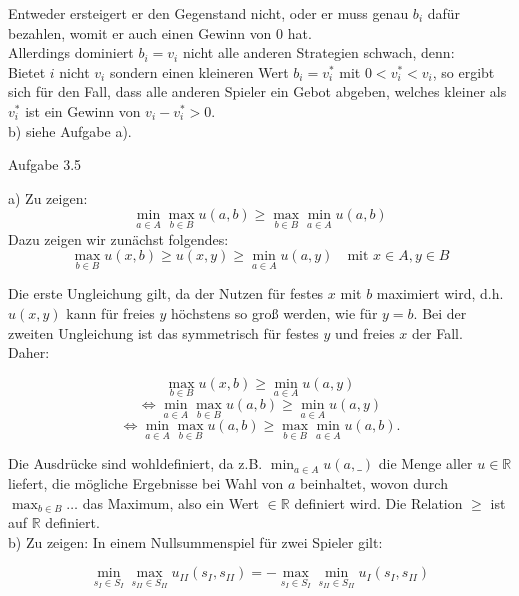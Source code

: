 \documentclass{scrartcl}
\begin{document}
Entweder ersteigert er den Gegenstand nicht, oder er muss genau $b_i$ dafür bezahlen, womit er auch
einen Gewinn von 0 hat. \\

Allerdings dominiert $b_i = v_i$ nicht alle anderen Strategien schwach, denn: \\

Bietet $i$ nicht $v_i$ sondern einen kleineren Wert $b_i = v_i^*$ mit $0 < v_i^* < v_i$, so ergibt
sich für den Fall, dass alle anderen Spieler ein Gebot abgeben, welches kleiner als $v_i^*$ ist ein
Gewinn von $v_i - v_i^* > 0$. \\

b) siehe Aufgabe a). \\

\begin{Large}
Aufgabe 3.5\\[0.0cm]
\end{Large}

a) Zu zeigen: \\
\[
\min_{a \in A} \max_{b \in B} u(a,b) \geq \max_{b \in B} \min_{a \in A} u(a,b)
\]
Dazu zeigen wir zunächst folgendes:
\[
\max_{b \in B} u(x,b) \geq u(x,y) \geq \min_{a \in A} u(a,y) \quad \text{mit }  x \in A, y \in B
\]

Die erste Ungleichung gilt, da der Nutzen für festes $x$ mit $b$ maximiert wird, d.h. $u(x,y)$ kann
für freies $y$ höchstens so groß werden, wie für $y = b$. Bei der zweiten Ungleichung ist das
symmetrisch für festes $y$ und freies $x$ der Fall. \\

Daher:

\[
\max_{b \in B} u(x,b) \geq \min_{a \in A} u(a,y)
\]
\[
\Leftrightarrow \min_{a \in A} \max_{b \in B} u(a,b) \geq \min_{a \in A} u(a,y)
\]
\[
\Leftrightarrow \min_{a \in A} \max_{b \in B} u(a,b) \geq \max_{b \in B} \min_{a \in A} u(a,b).
\]

Die Ausdrücke sind wohldefiniert, da z.B. $\min_{a \in A} u(a,\_)$ die Menge aller $u \in \mathbb{R}$
liefert, die mögliche Ergebnisse bei Wahl von $a$ beinhaltet, wovon durch $\max_{b \in B} \ldots$
das Maximum, also ein Wert $\in \mathbb{R}$ definiert wird. Die Relation $\geq$ ist auf
$\mathbb{R}$ definiert. \\

b) Zu zeigen: In einem Nullsummenspiel für zwei Spieler gilt:

\[
\min_{s_I \in S_I} \max_{s_{II} \in S_{II}} u_{II}(s_I,s_{II}) = - \max_{s_I \in S_I} \min_{s_{II} 
\in S_{II}} u_I(s_I,s_{II})
\]
\end{document}
